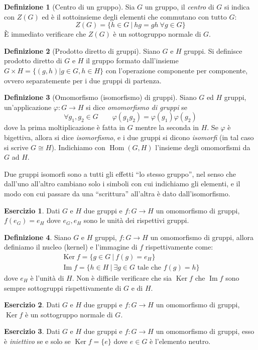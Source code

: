\documentclass[11pt]{article}
\theoremstyle{plain}
\theoremstyle{definition}
\newtheorem{defn}{Definizione}[section]
\newtheorem{exercise}{Esercizio}[section]
\theoremstyle{remark}
\DeclareMathOperator{\Hom}{Hom}
\DeclareMathOperator{\Ker}{Ker}
\DeclareMathOperator{\Imm}{Im}
\begin{document}
\begin{defn}[Centro di un gruppo]
	Sia $G$ un gruppo, il \emph{centro} di $G$ si indica con $Z(G)$ ed è il sottoinsieme degli elementi che commutano con tutto $G$:
	\[Z(G)=\{ h\in G\ |\ hg=gh\ \forall g\in G \}\]
	\`E immediato verificare che $Z(G)$ è un sottogruppo normale di $G$.
\end{defn}

\begin{defn}[Prodotto diretto di gruppi]
Siano $G$ e $H$ gruppi. Si definisce prodotto diretto di $G$ e $H$ il gruppo formato dall'insieme $G \times H = \{ (g, h) | g \in G, h \in H\}$ con l'operazione componente per componente, ovvero separatemente per i due gruppi di partenza.
\end{defn}


\begin{defn}[Omomorfismo (isomorfismo) di gruppi]
Siano $G$ ed $H$ gruppi, un'applicazione $\varphi:G\to H$ si dice \textit{omomorfismo di gruppi} se
\[\forall g_1,g_2\in G\qquad \varphi(g_1 g_2)=\varphi(g_1)\varphi(g_2)\]
dove la prima moltiplicazione è fatta in $G$ mentre la seconda in $H$.
Se $\varphi$ è bigettiva, allora si dice \emph{isomorfismo}, e i due gruppi si dicono \emph{isomorfi} (in tal caso si scrive $G\cong H$).
Indichiamo con $\Hom(G,H)$ l'insieme degli omomorfismi da $G$ ad $H$.
\end{defn}

Due gruppi isomorfi sono a tutti gli effetti ``lo stesso gruppo'', nel senso che dall'uno all'altro cambiano
solo i simboli con cui indichiamo gli elementi, e il modo con cui passare da una ``scrittura'' all'altra è dato dall'isomorfismo.

\begin{exercise}
	Dati $G$ e $H$ due gruppi e $f:G\to H$ un omomorfismo di gruppi, $f(e_G) = e_H$ dove $e_G,e_H$ sono le unità dei rispettivi gruppi.
\end{exercise}

\begin{defn}
	Siano $G$ e $H$ gruppi, $f:G\to H$ un omomorfismo di gruppi, allora definiamo il nucleo (kernel) e l'immagine di $f$ rispettivamente come:
	\begin{gather*}
		\Ker f = \{g\in G\ |\ f(g)=e_H\}\\
		\Imm f =\{ h\in H\ |\ \exists g\in G\text{ tale che }f(g)=h\}
	\end{gather*}
	dove $e_H$ è l'unità di $H$.
	Non è difficile verificare che sia $\Ker f$ che $\Imm f$ sono sempre sottogruppi rispettivamente di $G$ e di $H$.
\end{defn}
\begin{exercise}
	Dati $G$ e $H$ due gruppi e $f:G\to H$ un omomorfismo di gruppi, $\Ker f$ è un sottogruppo normale di $G$.
\end{exercise}
\begin{exercise}
	Dati $G$ e $H$ due gruppi e $f:G\to H$ un omomorfismo di gruppi, esso è \emph{iniettivo} se e solo se $\Ker f = \{e\}$ dove $e\in G$ è l'elemento neutro.
\end{exercise}
\end{document}
